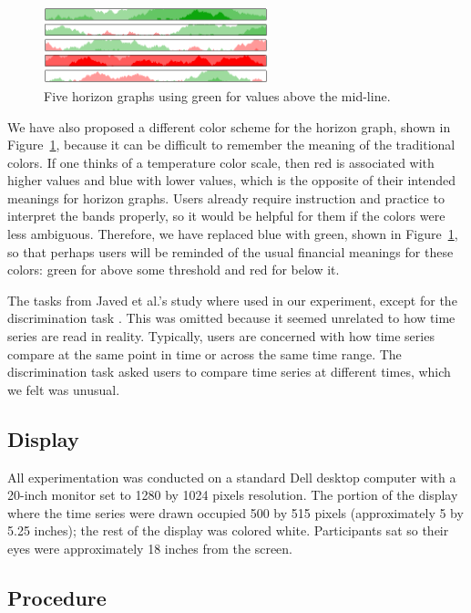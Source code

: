 \documentclass{article}
\begin{document}
\begin{figure}[h]
	\centering
	\includegraphics[width=6.5cm]{figures/horizon-new.png}
	\caption{Five horizon graphs using green for values above the mid-line.}
	\label{fig:newHorizon}
\end{figure}

We have also proposed a different color scheme for the horizon graph, shown in Figure~\ref{fig:newHorizon}, because it can be difficult to remember the meaning of the traditional colors.  If one thinks of a temperature color scale, then red is associated with higher values and blue with lower values, which is the opposite of their intended meanings for horizon graphs.  Users already require instruction and practice to interpret the bands properly, so it would be helpful for them if the colors were less ambiguous.  Therefore, we have replaced blue with green, shown in Figure~\ref{fig:newHorizon}, so that perhaps users will be reminded of the usual financial meanings for these colors: green for above some threshold and red for below it.

The tasks from Javed et al.'s study where used in our experiment, except for the discrimination task \cite{javed2010}.  This was omitted because it seemed unrelated to how time series are read in reality.  Typically, users are concerned with how time series compare at the same point in time or across the same time range.  The discrimination task asked users to compare time series at different times, which we felt was unusual.

\subsection{Display}

All experimentation was conducted on a standard Dell desktop computer with a 20-inch monitor set to 1280 by 1024 pixels resolution.  The portion of the display where the time series were drawn occupied 500 by 515 pixels (approximately 5 by 5.25 inches); the rest of the display was colored white.  Participants sat so their eyes were approximately 18 inches from the screen.

\subsection{Procedure}
\end{document}
